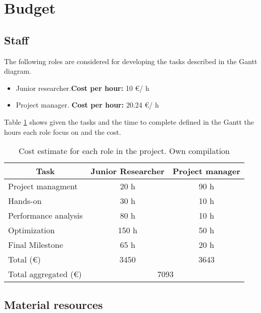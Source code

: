 \section{Budget}

\subsection{Staff}

\justify
The following roles are considered for developing the tasks described in the Gantt diagram.

\begin{itemize}
  \item Junior researcher.\textbf{Cost per hour: } 10 \euro / h
  \item Project manager. \textbf{Cost per hour:} 20.24 \euro / h
\end{itemize}

\justify
Table \ref{tab:staffcost} shows given the tasks and the time to complete defined in the Gantt the hours each role focus on and the cost.

\begin{table}[htbp!]
\centering
\begin{tabular}{|l|c|c|}
\hline
\multicolumn{1}{|c|}{Task} & Junior Researcher & Project manager \\ \hline
Project managment          & 20 h              & 90 h            \\ \hline
Hands-on                   & 30 h              & 10 h            \\ \hline
Performance analysis       & 80 h              & 10 h            \\ \hline
Optimization               & 150 h             & 50 h            \\ \hline
Final Milestone            & 65 h              & 20 h            \\ \hline
Total (\euro)              & 3450              & 3643            \\ \hline
Total aggregated (\euro)    & \multicolumn{2}{c|}{7093}           \\ \hline
\end{tabular}
\caption[Cost estimate for each role in the project.]{Cost estimate for each role in the project. Own compilation}
\label{tab:staffcost}
\end{table}


\subsection{Material resources}

